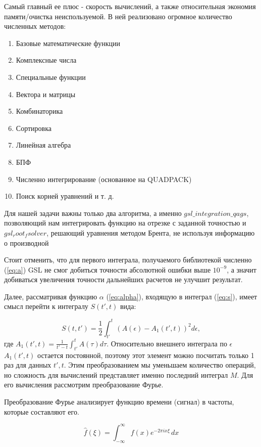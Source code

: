 \documentclass[%
bachelor,    %
natbib,      %
subf,        %
href,        %
colorlinks,  %
]{disser}
\begin{document}
Самый главный ее плюс - скорость вычислений, а также относительная экономия памяти/очистка неиспользуемой. В ней реализовано огромное количество численных методов:

\begin{enumerate} 
	\item Базовые математические функции
	\item Комплексные числа
	\item Специальные функции
	\item Вектора и матрицы
	\item Комбинаторика
	\item Сортировка
	\item Линейная алгебра
	\item БПФ
	\item Численно интегрирование (основанное на QUADPACK)
	\item Поиск корней уравнений и т. д.
\end{enumerate}

Для нашей задачи важны только два алгоритма, а именно $gsl\_integration\_qags$, позволяющий нам интегрировать функцию на отрезке с заданной точностью и $gsl_root_fsolver$, решающий уравнения методом Брента, не используя информацию о производной \cite{gsl:website}

Стоит отменить, что для первого интеграла, получаемого библиотекой численно (\ref{eq:a}) GSL не смог добиться точности абсолютной ошибки выше $10^{-9}$, а значит добиваться увеличения точности дальнейших расчетов не улучшит результат.

Далее, рассматривая функцию $\alpha$ (\ref{eq:alpha}), входящую в интеграл (\ref{eq:s}), имеет смысл перейти к интегралу $S(t', t)$ вида:

\begin{equation}\label{eq:s_integrate2}
S(t, t') = \frac{1}{2}\int_{t'}^{t} \left( A(\epsilon) - A_1(t', t) \right)^2 d\epsilon,
\end{equation}
где $A_1(t', t) = \frac{1}{t'-t}\int_{t'}^{t}A(\tau) d\tau$. Относительно внешнего интеграла по $\epsilon$ $A_1(t', t)$ остается постоянной, поэтому этот элемент можно посчитать только 1 раз для данных $t' ,t$. Этим преобразованием мы уменьшаем количество операций, но сложность для вычислений представляет именно последний интеграл $M$. Для его вычисления рассмотрим преобразование Фурье.

Преобразование Фурье анализирует функцию времени (сигнал) в частоты, которые составляют его.

$$\hat{f}(\xi) =\int_{-\infty}^{\infty}f(x)e^{-2\pi ix\xi }\,dx$$
\end{document}
